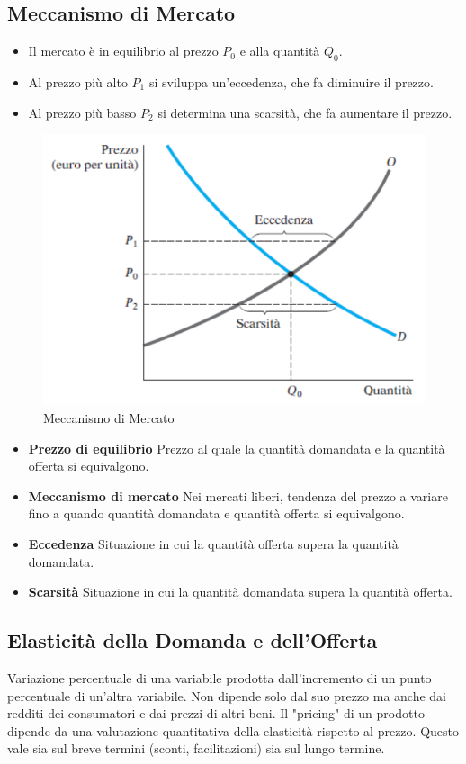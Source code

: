 \documentclass[12pt]{article}
\begin{document}
\subsection{Meccanismo di Mercato}
\begin{itemize}
    \item Il mercato è in equilibrio al prezzo $P_0$ e alla quantità $Q_0$.
    \item Al prezzo più alto $P_1$ si sviluppa un’eccedenza, che fa diminuire il prezzo.
    \item Al prezzo più basso $P_2$ si determina una scarsità, che fa aumentare il prezzo.
\end{itemize}
\FloatBarrier
\begin{figure}[!htb]
    \centering
    \includegraphics[width=1\textwidth]{images/mercato.png}
    \caption{Meccanismo di Mercato}
\end{figure}
\begin{itemize}
    \item \textbf{Prezzo di equilibrio} Prezzo al quale la quantità domandata e la quantità offerta si equivalgono.
    \item \textbf{Meccanismo di mercato} Nei mercati liberi, tendenza del prezzo a variare fino a quando quantità domandata e quantità offerta si equivalgono.
    \item \textbf{Eccedenza} Situazione in cui la quantità offerta supera la quantità domandata.
    \item \textbf{Scarsità} Situazione in cui la quantità domandata supera la quantità offerta.
\end{itemize}
\subsection{Elasticità della Domanda e dell'Offerta}
Variazione percentuale di una variabile prodotta dall’incremento di un punto percentuale di un’altra variabile. Non dipende solo dal suo prezzo ma anche dai redditi dei consumatori e dai prezzi di altri beni. Il "pricing" di un prodotto dipende da una valutazione quantitativa della elasticità rispetto al prezzo. Questo vale sia sul breve termini (sconti, facilitazioni) sia sul lungo termine.
\end{document}
